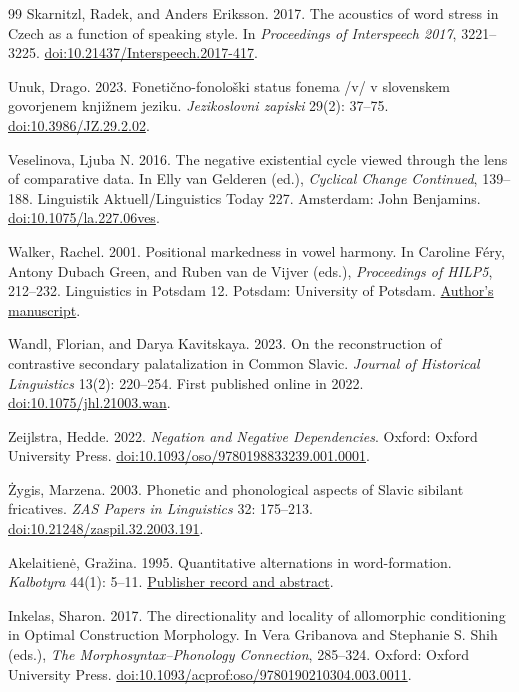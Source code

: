 \begin{thebibliography}{99}
Skarnitzl, Radek, and Anders Eriksson. 2017.
The acoustics of word stress in Czech as a function of speaking style.
In \textit{Proceedings of Interspeech 2017}, 3221--3225.
\href{https://doi.org/10.21437/Interspeech.2017-417}{doi:10.21437/Interspeech.2017-417}.

Unuk, Drago. 2023.
Fonetično-fonološki status fonema /v/ v slovenskem govorjenem knjižnem jeziku.
\textit{Jezikoslovni zapiski} 29(2): 37--75.
\href{https://doi.org/10.3986/JZ.29.2.02}{doi:10.3986/JZ.29.2.02}.

Veselinova, Ljuba N. 2016.
The negative existential cycle viewed through the lens of comparative data.
In Elly van Gelderen (ed.), \textit{Cyclical Change Continued}, 139--188.
Linguistik Aktuell/Linguistics Today 227.
Amsterdam: John Benjamins.
\href{https://doi.org/10.1075/la.227.06ves}{doi:10.1075/la.227.06ves}.

Walker, Rachel. 2001.
Positional markedness in vowel harmony.
In Caroline F\'ery, Antony Dubach Green, and Ruben van de Vijver (eds.),
\textit{Proceedings of HILP5}, 212--232.
Linguistics in Potsdam 12. Potsdam: University of Potsdam.
\href{https://bpb-us-e1.wpmucdn.com/sites.ucsc.edu/dist/f/1313/files/2021/10/HILP5.pdf}{Author's manuscript}.

Wandl, Florian, and Darya Kavitskaya. 2023.
On the reconstruction of contrastive secondary palatalization in Common Slavic.
\textit{Journal of Historical Linguistics} 13(2): 220--254.
First published online in 2022.
\href{https://doi.org/10.1075/jhl.21003.wan}{doi:10.1075/jhl.21003.wan}.

Zeijlstra, Hedde. 2022.
\textit{Negation and Negative Dependencies}.
Oxford: Oxford University Press.
\href{https://doi.org/10.1093/oso/9780198833239.001.0001}{doi:10.1093/oso/9780198833239.001.0001}.

\.{Z}ygis, Marzena. 2003.
Phonetic and phonological aspects of Slavic sibilant fricatives.
\textit{ZAS Papers in Linguistics} 32: 175--213.
\href{https://doi.org/10.21248/zaspil.32.2003.191}{doi:10.21248/zaspil.32.2003.191}.

Akelaitienė, Gražina. 1995.
Quantitative alternations in word-formation.
\textit{Kalbotyra} 44(1): 5--11.
\href{https://journals.vu.lt/kalbotyra/en/article/view/31229}{Publisher record and abstract}.

Inkelas, Sharon. 2017.
The directionality and locality of allomorphic conditioning in Optimal Construction Morphology.
In Vera Gribanova and Stephanie S. Shih (eds.),
\textit{The Morphosyntax--Phonology Connection}, 285--324.
Oxford: Oxford University Press.
\href{https://doi.org/10.1093/acprof:oso/9780190210304.003.0011}{doi:10.1093/acprof:oso/9780190210304.003.0011}.


\end{thebibliography}
